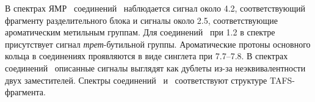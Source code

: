 В спектрах ЯМР~ соединений~ наблюдается сигнал около \SI{4.2}{\ppm}, соответствующий  фрагменту разделительного блока и сигналы около \SI{2.5}{\ppm}, соответствующие ароматическим метильным группам. Для соединений~ при \SI{1.2}{\ppm} в спектре присутствует сигнал \emph{трет}-бутильной группы. Ароматические протоны основного  кольца в соединениях  проявляются в виде синглета при 7.7--\SI{7.8}{\ppm}. В спектрах соединений~ описанные сигналы выглядят как дублеты из-за неэквивалентности двух заместителей. Спектры  соединений~ и~ соответствуют структуре TAFS-фрагмента.

